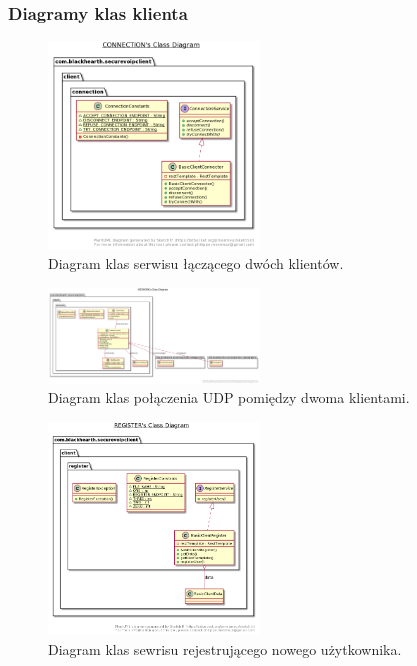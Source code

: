 
\subsubsection{Diagramy klas klienta}
\begin{figure}[H]
	\includegraphics[width=0.5\textwidth]{images/uml/1.png}
	\centering	
	\caption{\centering Diagram klas serwisu łączącego dwóch klientów.}
\end{figure}
\begin{figure}[H]
	\includegraphics[width=0.5\textwidth]{images/uml/2.png}
	\centering	
	\caption{\centering Diagram klas połączenia UDP pomiędzy dwoma klientami.}
\end{figure}
\begin{figure}[H]
	\includegraphics[width=0.5\textwidth]{images/uml/3.png}
	\centering	
	\caption{\centering Diagram klas sewrisu rejestrującego nowego użytkownika.}
\end{figure}
